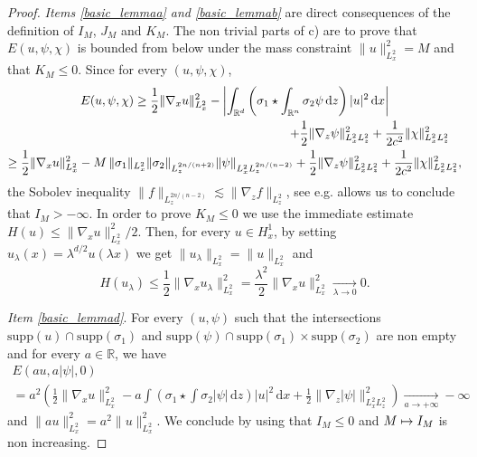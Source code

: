 \documentclass[JEP,XML,SOM,NoEqCountersInSection,NoFloatCountersInSection,Unicode,published]{cedram}
\newcommand\mto{\mathchoice{\longmapsto}{\mapsto}{\mapsto}{\mapsto}}
\theoremstyle{definition}
\newcommand{\R}{\mathbb{R}}
\newcommand{\ud}{\, {\mathrm{d}}}
\begin{document}
\begin{proof}
\textit{Items \eqref{basic_lemmaa} and \eqref{basic_lemmab}} are direct consequences of the definition of $I_{M}$, $J_{M}$ and $K_{M}$. The non trivial parts of c) are to prove that $E(u,\psi,\chi)$ is bounded from below under the mass constraint $\|u\|_{L_{x}^{2}}^{2}=M$ and that $K_{M}\leq 0$. Since for every $(u,\psi,\chi)$,\vspace*{-5pt}
\bgroup
{}
\begin{multline}\label{gradient_borne}
E(u,\psi,\chi)\geq\frac{1}{2}\|\nabla_{x}u\|_{L_{x}^{2}}^{2}-\left|\int_{\R^{d}}\left(\sigma_{1}\star\int_{\R^{n}}\sigma_{2}\psi\ud z\right)|u|^{2}\ud x\right| \\
\shoveright{+\frac{1}{2}\|\nabla_{z}\psi\|_{L_{x}^{2}L_{z}^{2}}^{2}+\frac{1}{2c^{2}}\|\chi\|_{L_{x}^{2}L_{z}^{2}}^{2}}\\
\geq\frac{1}{2}\|\nabla_{x}u\|_{L_{x}^{2}}^{2}-M\,\|\sigma_{1}\|_{L_{x}^{2}}\|\sigma_{2}\|_{L_{z}^{2n/(n+2)}}\|\psi\|_{L_{x}^{2}L_{z}^{2n/(n-2)}}
+\frac{1}{2}\|\nabla_{z}\psi\|_{L_{x}^{2}L_{z}^{2}}^{2}+\frac{1}{2c^{2}}\|\chi\|_{L_{x}^{2}L_{z}^{2}}^{2},
\end{multline}
\egroup
the Sobolev inequality $\|f\|_{L_{z}^{2n/(n-2)}}\lesssim\|\nabla_{z}f\|_{L_{z}^{2}}$, see e.g. \cite[Th., p.\,125]{Nir} allows us to conclude that $I_{M}>-\infty$. In order to prove $K_{M}\leq 0$ we use the immediate estimate $H(u)\leq \|\nabla_{x}u\|_{L_{x}^{2}}^{2}/2$. Then, for every $u\in H_{x}^{1}$, by setting $u_{\lambda}(x)=\lambda^{d/2}u(\lambda x)$ we get $\|u_{\lambda}\|_{L_{x}^{2}}=\|u\|_{L_{x}^{2}}$ and
\[
H(u_{\lambda})\leq\frac{1}{2}\|\nabla_{x}u_{\lambda}\|_{L_{x}^{2}}^{2}=\frac{\lambda^{2}}{2}\|\nabla_{x}u\|_{L_{x}^{2}}^{2}\underset{\lambda\to 0}{\to}0.
\]

\textit{Item \eqref{basic_lemmad}}. For every $(u,\psi)$ such that the intersections $\mathrm{supp}(u)\cap\mathrm{supp}(\sigma_{1})$ and $\mathrm{supp}(\psi)\cap\mathrm{supp}(\sigma_{1})\times\mathrm{supp}(\sigma_{2})$ are non empty and for every $a\in\R$, we have
\begin{multline*}
E(au,a|\psi|,0)
\\
= a^{2}\left(\frac{1}{2}\|\nabla_{x}u\|_{L_{x}^{2}}^{2}-a\int\left(\sigma_{1}\star\int\sigma_{2}|\psi|\ud z\right)|u|^{2}\ud x+\frac{1}{2}\|\nabla_{z}|\psi|\|_{L_{x}^{2}L_{z}^{2}}^{2}\right)\underset{a\to+\infty}{\to}-\infty
\end{multline*}
and $\|au\|_{L_{x}^{2}}^{2}=a^{2}\|u\|_{L_{x}^{2}}^{2}$. We conclude by using that $I_{M}\leq 0$ and $M\mto I_{M}$ is non increasing.


\end{proof}
\end{document}

